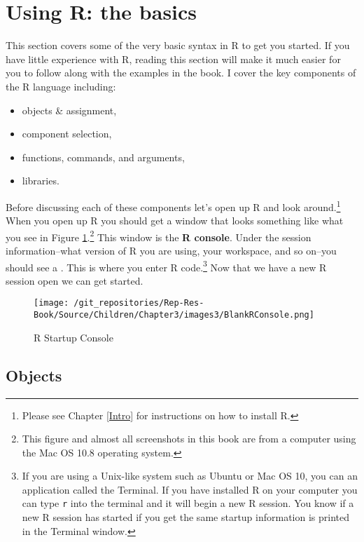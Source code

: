 \documentclass[ChapterTOCs,krantz1]{krantz}\usepackage{graphicx, color}
\begin{document}
\section{Using R: the basics}

This section covers some of the very basic syntax in R to get you started. If you have little experience with R, reading this section will make it much easier for you to follow along with the examples in the book. I cover the key components of the R language including:

\begin{itemize}
    \item objects \& assignment,
    \item component selection,
    \item functions, commands, and arguments,
    \item libraries.
\end{itemize}

Before discussing each of these components let's open up R and look around.\footnote{Please see Chapter \ref{Intro} for instructions on how to install R.} When you open up R you should get a window that looks something like what you see in Figure \ref{RBlankMain}.\footnote{This figure and almost all screenshots in this book are from a computer using the Mac OS 10.8 operating system.} This window is the {\bf{R console}}. Under the session information--what version of R you are using, your workspace, and so on--you should see a {\tt{\greaterthan}}. This is where you enter R code.\footnote{If you are using a Unix-like system such as Ubuntu or Mac OS 10, you can an application called the Terminal. If you have installed R on your computer you can type {\tt{r}} into the terminal and it will begin a new R session. You know if a new R session has started if you get the same startup information is printed in the Terminal window.} Now that we have a new R session open we can get started. 

\begin{figure}[th!]
    \caption{R Startup Console}
    \label{RBlankMain}

    \texttt{[image: /git\_repositories/Rep-Res-Book/Source/Children/Chapter3/images3/BlankRConsole.png]}
\end{figure}

\subsection{Objects}
\end{document}
